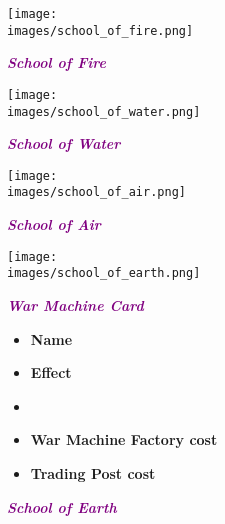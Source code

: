 \begin{wrapfigure}{R}{0.5\textwidth}
  \begin{center}
      \centering
      \texttt{[image: \\images/school\_of\_fire.png]}
      \caption{{\textit{\textbf{\textcolor{purple}{School of Fire}}}}}
    \endminipage
      \centering
      \texttt{[image: \\images/school\_of\_water.png]}
      \caption{{\textit{\textbf{\textcolor{purple}{School of Water}}}}}
    \endminipage
    \hfill\allowbreak%
    \bigbreak
      \centering
      \texttt{[image: \\images/school\_of\_air.png]}
      \caption{{\textit{\textbf{\textcolor{purple}{School of Air}}}}}
    \endminipage
      \centering
      \texttt{[image: \\images/school\_of\_earth.png]}
      \caption{{\textit{\textbf{\textcolor{purple}{School of Earth}}}}}
    \endminipage
    \hfill\allowbreak%
    \bigbreak
    \begin{minipage}[t]{0.48\textwidth}
    \centering
    \begin{scriptsize}
    \end{scriptsize}
    \break
    \footnotesize{\textbf{\textit{\textcolor{purple}{War Machine Card}}}}
    \scriptsize
    \begin{multicols}{2}
      \begin{itemize}
        \item[\textbf{1.}] \textbf{Name}
        \item[\textbf{2.}] \textbf{Effect}
        \item[\textbf{\phantom{.}}] \phantom{.}
        \item[\textbf{3.}] \textbf{War Machine Factory cost}
        \item[\textbf{4.}] \textbf{Trading Post cost}
      \end{itemize}
    \end{multicols}
  \end{minipage}
  \end{center}
\end{wrapfigure}
